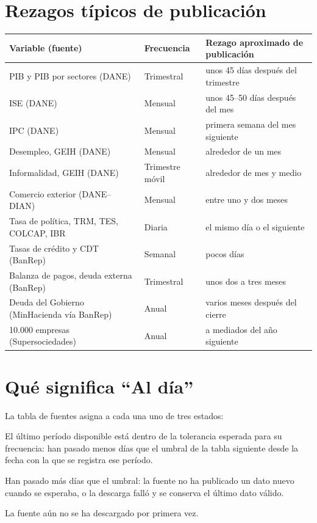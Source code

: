 \section{Rezagos típicos de publicación}
\begin{center}\small
\begin{tabularx}{\linewidth}{@{}llX@{}}
\toprule
\textbf{Variable (fuente)} & \textbf{Frecuencia} & \textbf{Rezago aproximado de publicación}\\\midrule
PIB y PIB por sectores (DANE) & Trimestral & unos 45 días después del trimestre\\
ISE (DANE) & Mensual & unos 45--50 días después del mes\\
IPC (DANE) & Mensual & primera semana del mes siguiente\\
Desempleo, GEIH (DANE) & Mensual & alrededor de un mes\\
Informalidad, GEIH (DANE) & Trimestre móvil & alrededor de mes y medio\\
Comercio exterior (DANE--DIAN) & Mensual & entre uno y dos meses\\
Tasa de política, TRM, TES, COLCAP, IBR & Diaria & el mismo día o el siguiente\\
Tasas de crédito y CDT (BanRep) & Semanal & pocos días\\
Balanza de pagos, deuda externa (BanRep) & Trimestral & unos dos a tres meses\\
Deuda del Gobierno (MinHacienda vía BanRep) & Anual & varios meses después del cierre\\
10.000 empresas (Supersociedades) & Anual & a mediados del año siguiente\\
\bottomrule
\end{tabularx}
\end{center}

\section{Qué significa ``Al día''}
\label{es:u:aldia}
La tabla de fuentes asigna a cada una uno de tres estados:
\begin{description}[style=nextline,leftmargin=0pt]
\item[Al día] El último período disponible está dentro de la tolerancia esperada para su frecuencia: han
  pasado menos días que el umbral de la tabla siguiente desde la fecha con la que se registra ese período.
\item[Retrasado] Han pasado más días que el umbral: la fuente no ha publicado un dato nuevo cuando se esperaba,
  o la descarga falló y se conserva el último dato válido.
\item[Pendiente] La fuente aún no se ha descargado por primera vez.
\end{description}


